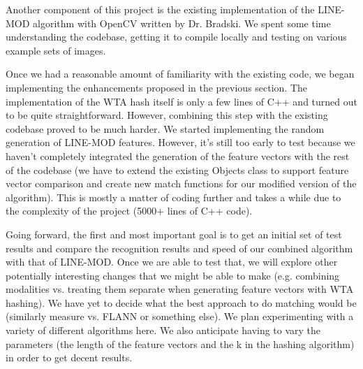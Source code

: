 \documentclass[10pt,twocolumn,letterpaper]{article}
\begin{document}
Another component of this project is the existing implementation of the LINE-MOD algorithm with OpenCV written by Dr. Bradski. We spent some time understanding the codebase, getting it to compile locally and testing on various example sets of images.

Once we had a reasonable amount of familiarity with the existing code, we began implementing the enhancements proposed in the previous section. The implementation of the WTA hash itself is only a few lines of C++ and turned out to be quite straightforward. However, combining this step with the existing codebase proved to be much harder. We started implementing the random generation of LINE-MOD features. However, it's still too early to test because we haven't completely integrated the generation of the feature vectors with the rest of the codebase (we have to extend the existing Objects class to support feature vector comparison and create new match functions for our modified version of the algorithm). This is mostly a matter of coding further and takes a while due to the complexity of the project (5000+ lines of C++ code).

Going forward, the first and most important goal is to get an initial set of test results and compare the recognition results and speed of our combined algorithm with that of LINE-MOD. Once we are able to test that, we will explore other potentially interesting changes that we might be able to make (e.g. combining modalities vs. treating them separate when generating feature vectors with WTA hashing). We have yet to decide what the best approach to do matching would be (similarly measure vs. FLANN or something else). We plan experimenting with a variety of different algorithms here. We also anticipate having to vary the parameters (the length of the feature vectors and the k in the hashing algorithm) in order to get decent results.
\end{document}
